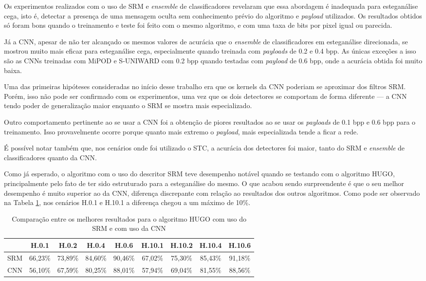 Os experimentos realizados com o uso de SRM e \textit{ensemble} de classificadores revelaram que essa abordagem é inadequada para esteganálise cega, isto é, detectar a presença de uma mensagem oculta sem conhecimento prévio do algoritmo e \textit{payload} utilizados. Os resultados obtidos só foram bons quando o treinamento e teste foi feito com o mesmo algoritmo, e com uma taxa de bits por pixel igual ou parecida.

Já a CNN, apesar de não ter alcançado os mesmos valores de acurácia que o \textit{ensemble} de classificadores em esteganálise direcionada, se mostrou muito mais eficaz para esteganálise cega, especialmente quando treinada com \textit{payloads} de 0.2 e 0.4 bpp. As únicas exceções a isso são as CNNs treinadas com MiPOD e S-UNIWARD com 0.2 bpp quando testadas com \textit{payload} de 0.6 bpp, onde a acurácia obtida foi muito baixa.

Uma das primeiras hipóteses consideradas no início desse trabalho era que os kernels da CNN poderiam se aproximar dos filtros SRM. Porém, isso não pode ser confirmado com os experimentos,  uma vez que os dois detectores se comportam de forma diferente --- a CNN tendo poder de generalização maior enquanto o SRM se mostra mais especializado.

Outro comportamento pertinente ao se usar a CNN foi a obtenção de piores resultados ao se usar os \textit{payloads} de 0.1 bpp e 0.6 bpp para o treinamento. Isso provavelmente ocorre porque quanto mais extremo o \textit{payload}, mais especializada tende a ficar a rede.

É possível notar também que, nos cenários onde foi utilizado o STC, a acurácia dos detectores foi maior, tanto do SRM e \textit{ensemble} de classificadores quanto da CNN.

Como já esperado, o algoritmo com o uso do descritor SRM teve desempenho notável quando se testando com o algoritmo HUGO, principalmente pelo fato de ter sido estruturado para a esteganálise do mesmo. O que acabou sendo surpreendente é que o seu melhor desempenho é muito superior ao da CNN, diferença discrepante com relação ao resultados dos outros algoritmos. Como pode ser observado na Tabela \ref{tab:hugo_comp}, nos cenários H.0.1 e H.10.1  a diferença chegou a um máximo de 10\%.

\begin{table}[h]
\centering
\caption{Comparação entre os melhores resultados para o algoritmo HUGO com uso do SRM e com uso da CNN}
\label{tab:hugo_comp}
\begin{tabular}{|c|c|c|c|c|c|c|c|c|}
\hline
    & H.0.1   & H.0.2   & H.0.4   & H.0.6   & H.10.1  & H.10.2  & H.10.4  & H.10.6  \\ \hline
SRM & 66,23\% & 73,89\% & 84,60\% & 90,46\% & 67,02\% & 75,30\% & 85,43\% & 91,18\% \\ \hline
CNN & 56,10\% & 67,59\% & 80,25\% & 88,01\% & 57,94\% & 69,04\% & 81,55\% & 88,56\% \\ \hline
\end{tabular}
\end{table}

